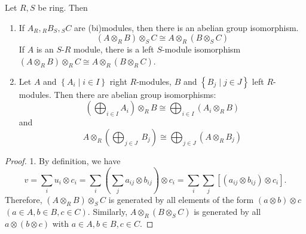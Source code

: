 \begin{theorem}
    \label{thm: operation laws of tensor products}
    Let $R,S$ be ring. Then
    \begin{enumerate}
        \item
              If  ${A}_{R},{ }_{{R}} B_{S},{ }_{{S}} C$ are (bi)modules, then there is an abelian group isomorphism.
              \begin{equation*}
                  \left({A} \otimes_{{R}} B\right) \otimes_{{S}} C
                  \cong
                  A \otimes_R \left(B \otimes_S C\right)
              \end{equation*}
              If $A$ is an $S$-$R$ module, there is a left $S$-module isomorphism $\left({A} \otimes_R B\right) \otimes_R C
                  \cong
                  A \otimes_R \left(B \otimes_R C\right)$.

        \item
              Let $A$ and $\left\{{A}_i \mid i \in I\right\}$ right $R$-modules, $B$ and $\left\{{B}_{{j}} \mid {j} \in {J}\right\}$ left $R$-modules.
              Then there are abelian group isomorphisms:
              \begin{equation*}
                  \left(\bigoplus_{i \in I} A_i\right) \otimes_{{R}} B
                  \cong
                  \bigoplus_{i \in I}\left({A}_i \otimes_{{R}} B\right)
              \end{equation*}
              and
              \begin{equation*}
                  A \otimes_{{R}}\left(\bigoplus_{j \in J} {~B}_j\right)
                  \cong
                  \bigoplus_{j \in J}\left(A \otimes_R B_j\right)
              \end{equation*}
    \end{enumerate}
    \begin{proof}
        1.
        By definition, we have
        \begin{equation*}
            v
            =
            \sum_i u_i \otimes c_i=\sum_i\left(\sum_j a_{i j} \otimes b_{i j}\right) \otimes c_i
            =
            \sum_i \sum_j\left[\left(a_{i j} \otimes b_{i j}\right) \otimes c_i\right] .
        \end{equation*}
        Therefore, $\left(A \otimes_R B\right) \otimes_S C$ is generated by all elements of the form $(a \otimes b) \otimes c$ $(a \in A, b \in B, c \in C)$. Similarly, $A \otimes_R\left(B \otimes_S C\right)$ is generated by all $a \otimes(b \otimes c)$ with $a \in A, b \in B, c \in C$.


\end{proof}
\end{theorem}
